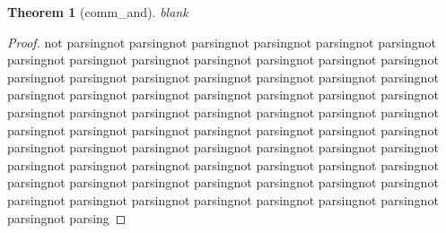 \documentclass{article}
\newtheorem{theorem}{Theorem}
[section]
\begin{document}
\begin{theorem}[comm\_and]
blank
\end{theorem}
\begin{proof}
not parsingnot parsingnot parsingnot parsingnot parsingnot parsingnot parsingnot parsingnot parsingnot parsingnot parsingnot parsingnot parsingnot parsingnot parsingnot parsingnot parsingnot parsingnot parsingnot parsingnot parsingnot parsingnot parsingnot parsingnot parsingnot parsingnot parsingnot parsingnot parsingnot parsingnot parsingnot parsingnot parsingnot parsingnot parsingnot parsingnot parsingnot parsingnot parsingnot parsingnot parsingnot parsingnot parsingnot parsingnot parsingnot parsingnot parsingnot parsingnot parsingnot parsingnot parsingnot parsingnot parsingnot parsingnot parsingnot parsingnot parsingnot parsingnot parsingnot parsingnot parsingnot parsingnot parsingnot parsingnot parsingnot parsingnot parsingnot parsingnot parsingnot parsingnot parsing
\end{proof}
\end{document}
